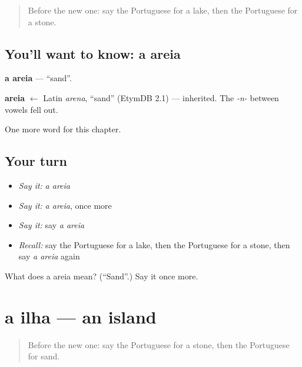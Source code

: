 \label{lesson:PT-C57-areia}



\begin{quote}
Before the new one: say the Portuguese for a lake, then the Portuguese for a stone.
\end{quote}

\subsection*{You'll want to know: a areia}
\textbf{a areia} — \textquotedblleft{}sand\textquotedblright{}.

\begin{cousinweb}
\textbf{areia} $\leftarrow$ Latin \emph{arena}, \textquotedblleft{}sand\textquotedblright{} (EtymDB 2.1) — inherited. The \emph{-n-} between vowels fell out.
\end{cousinweb}

\begin{grammarlens}[title={What you've built}]
One more word for this chapter.
\end{grammarlens}

\subsection*{Your turn}
\begin{itemize}
\raggedright
  \item \emph{Say it:} \emph{a areia}
  \item \emph{Say it:} \emph{a areia}, once more
  \item \emph{Say it:} say \emph{a areia}
  \item \emph{Recall:} say the Portuguese for a lake, then the Portuguese for a stone, then say \emph{a areia} again
\end{itemize}

\begin{tcolorbox}[breakable,colback=teal!4,colframe=teal!35!black,title={Before you move on}]
What does a areia mean? (\textquotedblleft{}Sand\textquotedblright{}.) Say it once more.
\end{tcolorbox}
\section[a ilha]{a ilha — an island}

\label{lesson:PT-C57-ilha}



\begin{quote}
Before the new one: say the Portuguese for a stone, then the Portuguese for sand.
\end{quote}


